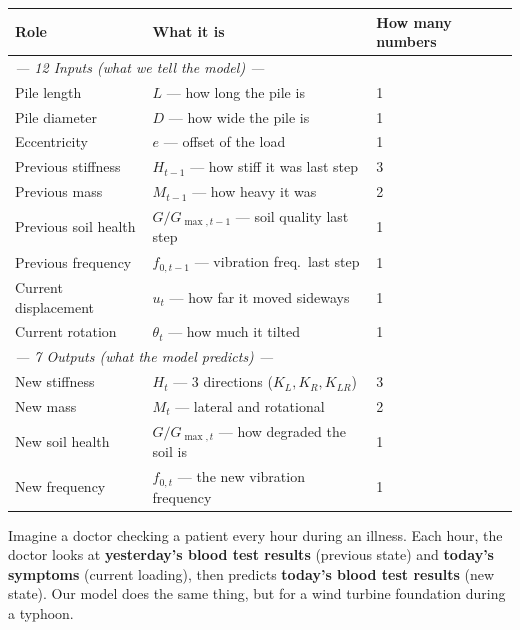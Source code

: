 \documentclass[11pt,a4paper]{article}
\begin{document}
\begin{center}
\begin{tabular}{lll}
\toprule
\textbf{Role} & \textbf{What it is} & \textbf{How many numbers} \\
\midrule
\multicolumn{3}{l}{\textit{--- 12 Inputs (what we tell the model) ---}} \\
Pile length          & $L$ --- how long the pile is          & 1 \\
Pile diameter        & $D$ --- how wide the pile is          & 1 \\
Eccentricity         & $e$ --- offset of the load            & 1 \\
Previous stiffness   & $H_{t-1}$ --- how stiff it was last step & 3 \\
Previous mass        & $M_{t-1}$ --- how heavy it was        & 2 \\
Previous soil health & $G/G_{\max,t-1}$ --- soil quality last step & 1 \\
Previous frequency   & $f_{0,t-1}$ --- vibration freq.\ last step & 1 \\
Current displacement & $u_t$ --- how far it moved sideways   & 1 \\
Current rotation     & $\theta_t$ --- how much it tilted     & 1 \\
\midrule
\multicolumn{3}{l}{\textit{--- 7 Outputs (what the model predicts) ---}} \\
New stiffness     & $H_t$ --- 3 directions ($K_L, K_R, K_{LR}$)  & 3 \\
New mass          & $M_t$ --- lateral and rotational              & 2 \\
New soil health   & $G/G_{\max,t}$ --- how degraded the soil is  & 1 \\
New frequency     & $f_{0,t}$ --- the new vibration frequency     & 1 \\
\bottomrule
\end{tabular}
\end{center}

\begin{analogybox}
Imagine a doctor checking a patient every hour during an illness.
Each hour, the doctor looks at \textbf{yesterday's blood test results}
(previous state) and \textbf{today's symptoms} (current loading),
then predicts \textbf{today's blood test results} (new state).
Our model does the same thing, but for a wind turbine foundation
during a typhoon.
\end{analogybox}
\end{document}
